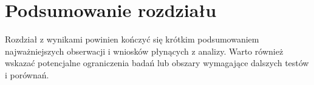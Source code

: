\section{Podsumowanie rozdziału}
Rozdział z wynikami powinien kończyć się krótkim podsumowaniem najważniejszych obserwacji i wniosków płynących z analizy. Warto również wskazać potencjalne ograniczenia badań lub obszary wymagające dalszych testów i porównań.
